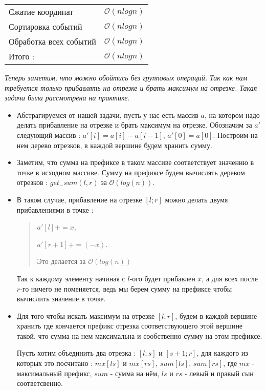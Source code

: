 \documentclass{article}
\begin{document}
\begin{center}
 \begin{tabular}{|l|c|}
 \hline
 Сжатие координат & $\mathcal{O}(nlogn)$ \\
 Сортировка событий & $\mathcal{O}(nlogn)$ \\
 Обработка всех событий & $\mathcal{O}(nlogn)$ \\
 \hline
 Итого : & $\mathcal{O}(nlogn)$ \\
 \hline
 \end{tabular}
 \label{ex:table}
\end{center}
\textit{Теперь заметим, что можно обойтись без групповых операций. Так как нам требуется только прибавлять на отрезке и брать максимум на отрезке. Такая задача была рассмотрена на практике.}
\begin{itemize}
\item Абстрагируемся от нашей задачи, пусть у нас есть массив $a$, на котором надо делать прибавление на отрезке и брать максимум на отрезке. Обозначим за $a'$ следующий массив : $a'[i] = a[i] - a[i - 1]$, $a'[0] = a[0]$. Построим на нем дерево отрезков, в каждой вершине будем хранить сумму.
\item Заметим, что сумма на префиксе в таком массиве соответствует значению в точке в исходном массиве. Сумму на префиксе будем вычислять деревом отрезков : $get_-sum(l, r)$ за $\mathcal{O}(log(n))$.
\item В таком случае, прибавление на отрезке $[l; r]$ можно делать двумя прибавлениями в точке :\begin{quotation}

 $a'[l] += x$, 
 
 $a'[r + 1] += (-x)$.
 
 Это делается за $\mathcal{O}(log(n))$ 
\end{quotation}
Так к каждому элементу начиная с $l$-ого будет прибавлен $x$, а для всех после $r$-го ничего не поменяется, ведь мы берем сумму на префиксе чтобы вычислить значение в точке.
\item Для того чтобы искать максимум на отрезке $[l;r]$, будем в каждой вершине хранить где кончается префикс отрезка соответствующего этой вершине такой, что сумма на нем максимальна и сообственно сумму на этом префиксе.


Пусть хотим объединить два отрезка : $[l; s]$ и $[s + 1; r]$, для каждого из которых это посчитано : 
$mx[ls]$ и $mx[rs]$, $sum[ls]$, $sum[rs]$, где $mx$ - максимальный префикс, $sum$ - сумма на нём, $ls$ и $rs$ - левый и правый сын соответсвенно.


\end{itemize}
\end{document}
